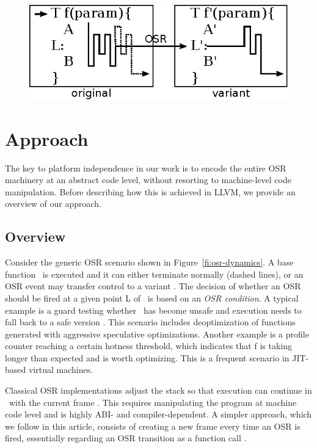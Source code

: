 
\ifdefined\noauthorea
\begin{figure}[t]
\begin{center}
\includegraphics[width=0.6\columnwidth]{figures/overview-osr/overview-osr.eps}
\caption{\protect}
\end{center}
\end{figure}
\fi

\section{Approach}
\label{se:approach}

The key to platform independence in our work is to encode the entire OSR machinery at an abstract code level, without resorting to machine-level code manipulation. Before describing how this is achieved in LLVM, we provide an overview of our approach.

\subsection{Overview}
\label{ss:overview}

Consider the generic OSR scenario shown in Figure~\ref{fi:osr-dynamics}. A base function \fbase\ is executed and it can either terminate normally (dashed lines), or an OSR event may transfer control to a variant \fvariant. The decision of whether an OSR should be fired at a given point \textsf{L} of \fbase\ is based on an {\em OSR condition}. A typical example is a guard testing whether \fbase\ has become unsafe and execution needs to fall back to a safe version \fvariant. This scenario includes deoptimization of functions generated with aggressive speculative optimizations. Another example is a profile counter reaching a certain hotness threshold, which indicates that \textsf{f} is taking longer than expected and is worth optimizing. This is a frequent scenario in JIT-based virtual machines.

Classical OSR implementations adjust the stack so that execution can continue in \fvariant\ with the current frame . This requires manipulating the program at machine code level and is highly ABI- and compiler-dependent. A simpler approach, which we follow in this article, consists of creating a new frame every time an OSR is fired, essentially regarding an OSR transition as a function call . 

